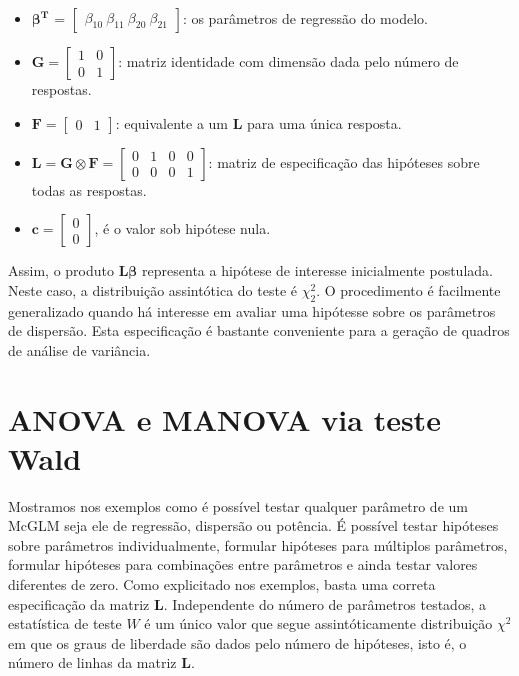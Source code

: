 \begin{itemize}
  
  \item $\boldsymbol{\beta^{T}}$ = $\begin{bmatrix} \beta_{10} \  \beta_{11} \  \beta_{20} \  \beta_{21} \end{bmatrix}$: os parâmetros de regressão do modelo.


\item $\boldsymbol{G} = \begin{bmatrix} 1 & 0 \\ 0 & 1  \end{bmatrix}$: matriz identidade com dimensão dada pelo número de respostas.

\item $\boldsymbol{F} = \begin{bmatrix} 0 & 1 \end{bmatrix}$: equivalente a um $\boldsymbol{L}$ para uma única resposta.

\item $\boldsymbol{L} = \boldsymbol{G} \otimes \boldsymbol{F} =  \begin{bmatrix} 0 & 1 & 0 & 0 \\
0 & 0 & 0 & 1 \end{bmatrix}$: matriz de especificação das hipóteses sobre todas as respostas.
 
\item $\boldsymbol{c} = \begin{bmatrix} 0 \\ 0 \end{bmatrix}$, é o valor sob hipótese nula. 

\end{itemize}

Assim, o produto $\boldsymbol{L}\boldsymbol{\beta}$ representa a hipótese de interesse inicialmente postulada. Neste caso, a distribuição assintótica do teste é $\chi^2_2$. O procedimento é facilmente generalizado quando há interesse em avaliar uma hipótesse sobre os parâmetros de dispersão. Esta especificação é bastante conveniente para a geração de quadros de análise de variância.

\section{ANOVA e MANOVA via teste Wald}

Mostramos nos exemplos como é possível testar qualquer parâmetro de um McGLM seja ele de regressão, dispersão ou potência. É possível testar hipóteses sobre parâmetros individualmente, formular hipóteses para múltiplos parâmetros, formular hipóteses para combinações entre parâmetros e ainda testar valores diferentes de zero. Como explicitado nos exemplos, basta uma correta especificação da matriz $\boldsymbol{L}$. Independente do número de parâmetros testados, a estatística de teste $W$ é um único valor que segue assintóticamente distribuição $\chi^2$ em que os graus de liberdade são dados pelo número de hipóteses, isto é, o número de linhas da matriz $\boldsymbol{L}$.

